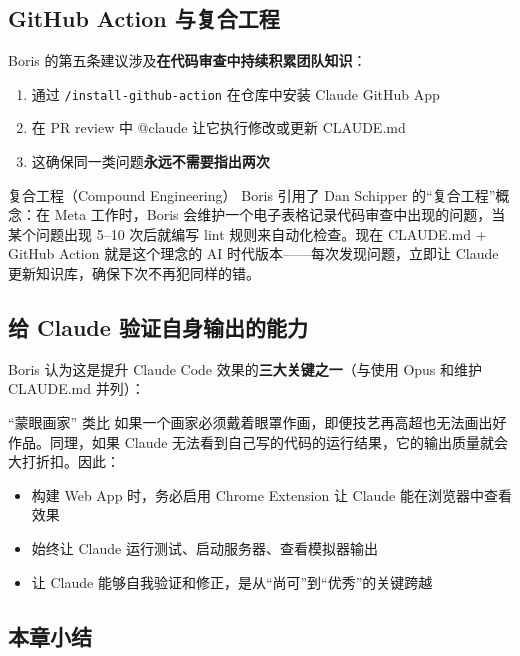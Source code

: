 \documentclass[a4paper]{article}
\begin{document}
\subsection{GitHub Action 与复合工程}

Boris 的第五条建议涉及\textbf{在代码审查中持续积累团队知识}：

\begin{enumerate}
    \item 通过 \texttt{/install-github-action} 在仓库中安装 Claude GitHub App
    \item 在 PR review 中 @claude 让它执行修改或更新 CLAUDE.md
    \item 这确保同一类问题\textbf{永远不需要指出两次}
\end{enumerate}

\begin{knowledgebox}{复合工程（Compound Engineering）}
Boris 引用了 Dan Schipper 的``复合工程''概念：在 Meta 工作时，Boris 会维护一个电子表格记录代码审查中出现的问题，当某个问题出现 5--10 次后就编写 lint 规则来自动化检查。现在 CLAUDE.md + GitHub Action 就是这个理念的 AI 时代版本——每次发现问题，立即让 Claude 更新知识库，确保下次不再犯同样的错。
\end{knowledgebox}

\subsection{给 Claude 验证自身输出的能力}

Boris 认为这是提升 Claude Code 效果的\textbf{三大关键之一}（与使用 Opus 和维护 CLAUDE.md 并列）：

\begin{warningbox}{``蒙眼画家'' 类比}
如果一个画家必须戴着眼罩作画，即便技艺再高超也无法画出好作品。同理，如果 Claude 无法看到自己写的代码的运行结果，它的输出质量就会大打折扣。因此：
\begin{itemize}
    \item 构建 Web App 时，务必启用 Chrome Extension 让 Claude 能在浏览器中查看效果
    \item 始终让 Claude 运行测试、启动服务器、查看模拟器输出
    \item 让 Claude 能够自我验证和修正，是从``尚可''到``优秀''的关键跨越
\end{itemize}
\end{warningbox}

\subsection{本章小结}
\end{document}
